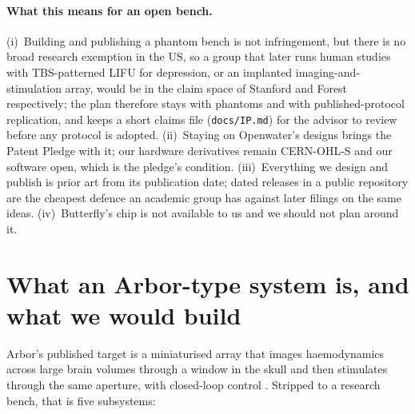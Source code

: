 \documentclass[11pt,a4paper]{article}
\begin{document}
\paragraph{What this means for an open bench.} (i)~Building and publishing a phantom bench is not infringement, but there is no broad research exemption in the US, so a group that later runs human studies with TBS-patterned LIFU for depression, or an implanted imaging-and-stimulation array, would be in the claim space of Stanford and Forest respectively; the plan therefore stays with phantoms and with published-protocol replication, and keeps a short claims file (\texttt{docs/IP.md}) for the advisor to review before any protocol is adopted. (ii)~Staying on Openwater's designs brings the Patent Pledge with it; our hardware derivatives remain CERN-OHL-S and our software open, which is the pledge's condition. (iii)~Everything we design and publish is prior art from its publication date; dated releases in a public repository are the cheapest defence an academic group has against later filings on the same ideas. (iv)~Butterfly's chip is not available to us and we should not plan around it.

\section{What an Arbor-type system is, and what we would build}

Arbor's published target is a miniaturised array that images haemodynamics across large brain volumes through a window in the skull and then stimulates through the same aperture, with closed-loop control \cite{forest1,arbor}. Stripped to a research bench, that is five subsystems:
\end{document}
